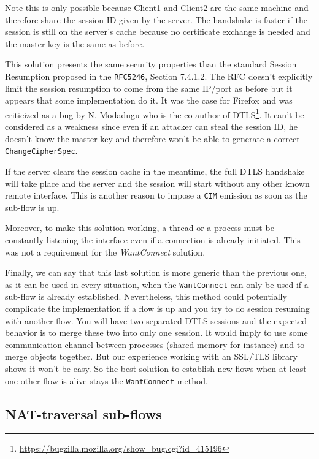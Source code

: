 Note this is only possible because Client1 and Client2 are the same machine and therefore share the session ID given by the server. The handshake is faster if the session is still on the server's cache because no certificate exchange is needed and the master key is the same as before.

This solution presents the same security properties than the standard Session Resumption proposed in the \texttt{RFC5246}\cite{RFC5246}, Section 7.4.1.2. The RFC doesn't explicitly limit the session resumption to come from the same IP/port as before but it appears that some implementation do it. It was the case for Firefox and was criticized as a bug by N. Modadugu who is the co-author of DTLS\footnote{\url{https://bugzilla.mozilla.org/show_bug.cgi?id=415196}}. It can't be considered as a weakness since even if an attacker can steal the session ID, he doesn't know the master key and therefore won't be able to generate a correct \texttt{ChangeCipherSpec}.

If the server clears the session cache in the meantime, the full DTLS handshake will take place and the server and the session will start without any other known remote interface. This is another reason to impose a \texttt{CIM} emission as soon as the sub-flow is up.

Moreover, to make this solution working, a thread or a process must be constantly listening the interface even if a connection is already initiated. This was not a requirement for the \textit{WantConnect} solution.

Finally, we can say that this last solution is more generic than the previous one, as it can be used in every situation, when the \texttt{WantConnect} can only be used if a sub-flow is already established. Nevertheless, this method could potentially complicate the implementation if a flow is up and you try to do session resuming with another flow. You will have two separated DTLS sessions and the expected behavior is to merge these two into only one session. It would imply to use some communication channel between processes (shared memory for instance) and to merge objects together. But our experience working with an SSL/TLS library shows it won't be easy. So the best solution to establish new flows when at least one other flow is alive stays the \texttt{WantConnect} method.

\subsection{NAT-traversal sub-flows}

